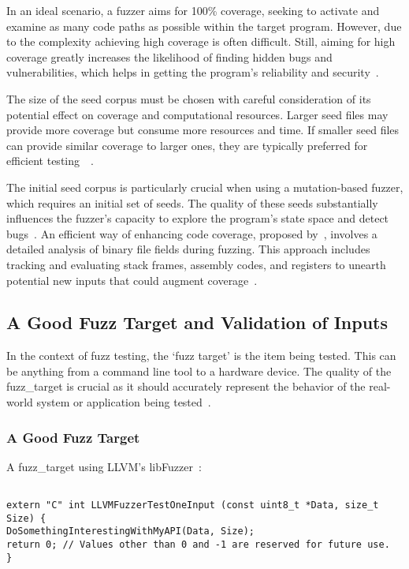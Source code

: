 In an ideal scenario, a fuzzer aims for 100\% coverage, seeking to activate and
examine as many code paths as possible within the target program. However, due
to the complexity achieving high coverage is
often difficult. Still, aiming for high coverage greatly increases the
likelihood of finding hidden bugs and vulnerabilities, which helps in getting
the program's reliability and security~\cite{godefroid2012sage}.

The size of the seed corpus must be chosen with careful consideration of
its potential effect on coverage and computational resources. Larger seed files
may provide more coverage but consume more resources and time. If smaller seed
files can provide similar coverage to larger ones, they are typically preferred
for efficient testing~\cite{liang2018fuzzing}~\cite{jurczyk2016effective}.

The initial seed corpus is particularly crucial when using a mutation-based
fuzzer, which requires an initial set of \gls{seeds}. The quality of these
\gls{seeds} substantially influences the fuzzer's capacity to explore the program's
state space and detect bugs~\cite{miller2007analysis}. An efficient way of
enhancing code coverage, proposed by~, involves a
detailed analysis of binary file fields during fuzzing. This approach includes
tracking and evaluating stack frames, assembly codes, and registers to unearth
potential new inputs that could augment coverage~\cite{kim2011efficient}.

\subsection{A Good Fuzz Target and Validation of Inputs}
In the context of fuzz testing, the `fuzz target' is the item being tested.
This can be anything from a command line tool to a hardware device. The quality
of the \gls{fuzz_target} is crucial as it should accurately represent the behavior of
the real-world system or application being tested~\cite{238602}.

\subsubsection{A Good Fuzz Target}

A \gls{fuzz_target} using LLVM's libFuzzer~\cite{libFuzze17:online}:

\begin{verbatim}

extern "C" int LLVMFuzzerTestOneInput (const uint8_t *Data, size_t Size) {
DoSomethingInterestingWithMyAPI(Data, Size);
return 0; // Values other than 0 and -1 are reserved for future use.
}

\end{verbatim}

